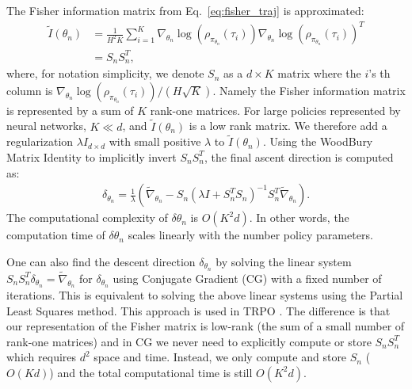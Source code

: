 \documentclass{article}
\begin{document}
The Fisher information matrix from Eq.~\ref{eq:fisher_traj} is approximated:
\begin{align}
\tilde{I}(\theta_n) &= \frac{1}{H^2K}\sum_{i=1}^K \nabla_{\theta_n}\log(\rho_{\pi_{\theta_n}}(\tau_i))\nabla_{\theta_n}\log(\rho_{\pi_{\theta_n}}(\tau_i))^T \nonumber\\
& = S_n S_n^T,
\end{align} where, for notation simplicity, we denote $S_n$ as a $d\times K$ matrix where the $i$'s th column is $\nabla_{\theta_n}\log(\rho_{\pi_{\theta_n}}(\tau_i))/(H\sqrt{K})$. Namely the Fisher information matrix is represented by a sum of $K$ rank-one matrices. For large policies represented by neural networks, $K\ll d$, and $\tilde{I}(\theta_n)$ is a low rank matrix. We therefore add a regularization $\lambda I_{d\times d}$ with small positive $\lambda$ to $\tilde{I}(\theta_n)$. Using the WoodBury Matrix Identity to implicitly invert $S_nS_n^T$, the final ascent direction is computed as:
\begin{align}
\label{eq:natural_finite}
\delta_{\theta_n} = \frac{1}{\lambda}(\tilde{\nabla}_{\theta_n} - S_n(\lambda I+S_n^TS_n)^{-1}S_n^T\tilde{\nabla}_{\theta_n}).
\end{align} The computational complexity of $\delta\theta_n$ is $O(K^2 d)$. In other words, the computation time of $\delta\theta_n$ scales linearly with the number policy parameters. 

One can also find the descent direction $\delta_{\theta_n}$ by solving the linear system $S_nS_n^T \delta_{\theta_n} = \tilde{\nabla}_{\theta_n}$ for $\delta_{\theta_n}$ using Conjugate Gradient (CG) with a fixed number of iterations. This is equivalent to solving the above linear systems using the Partial Least Squares method. This approach is used in TRPO \cite{schulman2015trust}. The difference is that our representation of the Fisher matrix is low-rank (the sum of a small number of rank-one matrices) and in CG we never need to explicitly compute or store $S_nS_n^T$ which requires $d^2$ space and time. Instead, we only compute and store $S_n$ ($O(Kd)$) and the total computational time is still $O(K^2 d)$.
\end{document}
